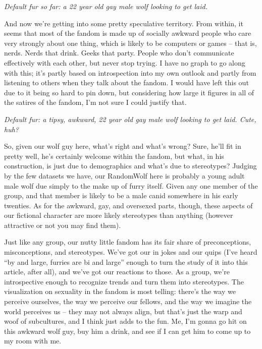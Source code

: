 \textit{Default fur so far: a 22 year old gay male wolf looking to get laid.}

And now we're getting into some pretty speculative territory.  From within, it seems that most of the fandom is made up of socially awkward people who care very strongly about one thing, which is likely to be computers or games -- that is, nerds.  Nerds that drink.  Geeks that party.  People who don't communicate effectively with each other, but never stop trying.  I have no graph to go along with this; it's partly based on introspection into my own outlook and partly from listening to others when they talk about the fandom.  I would have left this out due to it being so hard to pin down, but considering how large it figures in all of the satires of the fandom, I'm not sure I could justify that.

\textit{Default fur: a tipsy, awkward, 22 year old gay male wolf looking to get laid.  Cute, huh?}

So, given our wolf guy here, what's right and what's wrong?  Sure, he'll fit in pretty well, he's certainly welcome within the fandom, but what, in his construction, is just due to demographics and what's due to stereotypes?  Judging by the few datasets we have, our RandomWolf here is probably a young adult male wolf due simply to the make up of furry itself.  Given any one member of the group, and that member is likely to be a male canid somewhere in his early twenties.  As for the awkward, gay, and oversexed parts, though, these aspects of our fictional character are more likely stereotypes than anything (however attractive or not you may find them).

Just like any group, our nutty little fandom has its fair share of preconceptions, misconceptions, and stereotypes.  We've got our in jokes and our quips (I've heard ``by and large, furries are bi and large'' enough to turn the study of it into this article, after all), and we've got our reactions to those.  As a group, we're introspective enough to recognize trends and turn them into stereotypes.  The visualization on sexuality in the fandom is most telling: there's the way we perceive ourselves, the way we perceive our fellows, and the way we imagine the world perceives us -- they may not always align, but that's just the warp and woof of subcultures, and I think just adds to the fun.  Me, I'm gonna go hit on this awkward wolf guy, buy him a drink, and see if I can get him to come up to my room with me.
